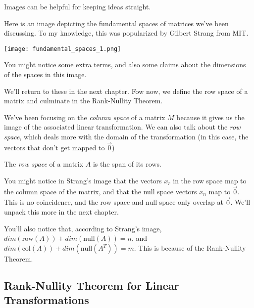 \documentclass{ximera}
\begin{document}
\begin{remark}

  Images can be helpful for keeping ideas straight. 

  Here is an image depicting the fundamental spaces of matrices we've been discussing. To my knowledge, this was popularized by Gilbert Strang from MIT.

\begin{center}
  \texttt{[image: fundamental\_spaces\_1.png]}
\end{center}

\end{remark}

You might notice some extra terms, and also some claims about the dimensions of the spaces in this image.

We'll return to these in the next chapter. Fow now, we define the row space of a matrix and culminate in the Rank-Nullity Theorem.

We've been focusing on the \emph{column space} of a matrix $M$ because it gives us the image of the associated linear transformation. We can also talk about the \emph{row space}, which deals more with the domain of the transformation (in this case, the vectors that don't get mapped to $\vec{0}$)

\begin{definition}

  The \emph{row space} of a matrix $A$ is the span of its rows. 

\end{definition}

\begin{remark}

  You might notice in Strang's image that the vectors $x_r$ in the row space map to the column space of the matrix, and that the null space vectors $x_n$ map to $\vec{0}$. This is no coincidence, and the row space and null space only overlap at  $\vec{0}$. We'll unpack this more in the next chapter.

\end{remark}
 
You'll also notice that, according to Strang's image, $dim(\mbox{row}(A))+dim(\mbox{null}(A))=n$, and $dim(\mbox{col}(A))+dim(\mbox{null}(A^T))=m$. This is because of the Rank-Nullity Theorem.

\subsection*{Rank-Nullity Theorem for Linear Transformations}
 
\end{document}
